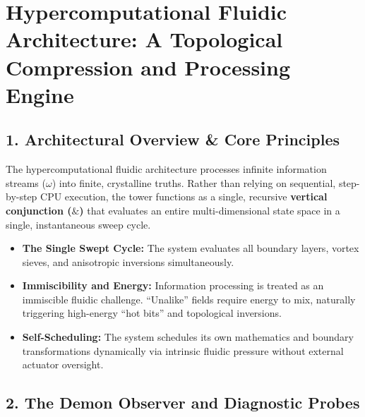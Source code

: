 \chapter{\texorpdfstring{Hypercomputational Fluidic Architecture: A Topological Compression and Processing Engine}{Hypercomputational Fluidic Architecture: A Topological Compression and Processing Engine}}
\label{chap:fluidic-1-demon-uroboros-construct-kit}

\section{\texorpdfstring{1. Architectural Overview \& Core Principles}{1. Architectural Overview \& Core Principles}}

The hypercomputational fluidic architecture processes infinite information streams (\(\omega\)) into finite, crystalline truths. Rather than relying on sequential, step-by-step CPU execution, the tower functions as a single, recursive \textbf{vertical conjunction (\(\&\))} that evaluates an entire multi-dimensional state space in a single, instantaneous sweep cycle.

\begin{itemize}
\item \textbf{The Single Swept Cycle:} The system evaluates all boundary layers, vortex sieves, and anisotropic inversions simultaneously.
\item \textbf{Immiscibility and Energy:} Information processing is treated as an immiscible fluidic challenge. “Unalike” fields require energy to mix, naturally triggering high-energy “hot bits” and topological inversions.
\item \textbf{Self-Scheduling:} The system schedules its own mathematics and boundary transformations dynamically via intrinsic fluidic pressure without external actuator oversight.
\end{itemize}

\medskip

\section{\texorpdfstring{2. The Demon Observer and Diagnostic Probes}{2. The Demon Observer and Diagnostic Probes}}


